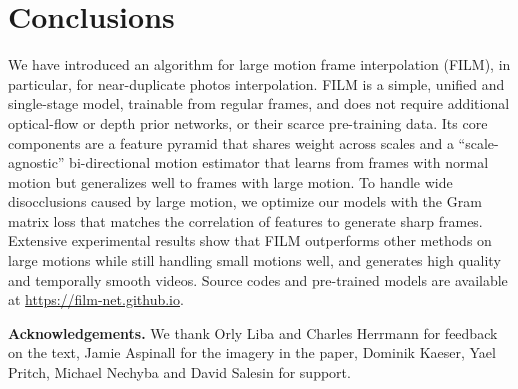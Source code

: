 \documentclass[runningheads]{llncs}
\begin{document}
\begin{table}[h!]
\small
\centering
{}
\caption{Inference time and memory comparison for a p frame interpolation.}
\label{tab:computational_complexity}
\vspace{-8ex}
\end{table} \section{Conclusions}


We have introduced an algorithm for large motion frame interpolation (FILM), in particular, for near-duplicate photos interpolation. FILM is a simple, unified and single-stage model, trainable from regular frames, and does not require additional optical-flow or depth prior networks, or their scarce pre-training data. Its core components are a feature pyramid that shares weight across scales and a ``scale-agnostic'' bi-directional motion estimator that learns from frames with normal motion but generalizes well to frames with large motion. To handle wide disocclusions caused by large motion, we optimize our models with the Gram matrix loss that matches the correlation of features to generate sharp frames. Extensive experimental results show that FILM outperforms other methods on large motions while still handling small motions well, and generates high quality and temporally smooth videos. Source codes and pre-trained models are available at \url{https://film-net.github.io}.
 
\clearpage

\noindent\textbf{Acknowledgements.} We thank Orly Liba and Charles Herrmann for feedback on the text, Jamie Aspinall for the imagery in the paper, Dominik Kaeser, Yael Pritch, Michael Nechyba and David Salesin for support.



\end{document}

